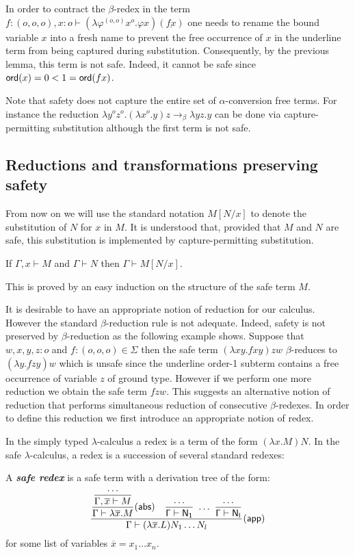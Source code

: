 \documentclass{llncs}
\newcommand\defname[1]{{\bf\em #1}\index{#1}}
\newcommand\betared{\rightarrow_\beta}
\newcommand\subst[2]{\left[ #1/#2 \right]}
\newcommand\dps{\displaystyle}
\newcommand\rulef[2]{\frac{\dps #1}{\dps #2}}
\newcommand\ord[1]{{\sf ord}(#1)}
\begin{document}
\begin{example}
In order to contract the $\beta$-redex in the term $f:(o,o,o),x:o \vdash (\lambda \varphi^{(o,o)} x^o . \varphi x) (\underline{f x})$ one needs to rename the bound variable $x$ into a fresh name to prevent the free occurrence of $x$ in the underline term from being captured during substitution. Consequently, by the previous lemma, this term is not safe. Indeed, it cannot be safe since $\ord{x} = 0 < 1 = \ord{f x}$.
\end{example}

Note that safety does not capture the entire set of $\alpha$-conversion free terms. For instance the reduction $\lambda y^o z^o. (\lambda x^o .y) z \betared \lambda yz.y$ can be done via capture-permitting substitution although the first term is not safe.

\subsection{Reductions and transformations preserving safety}

From now on we will use the standard notation $M\subst{N}{x}$ to denote the substitution of $N$ for $x$ in $M$.
It is understood that, provided that $M$ and $N$ are safe, this substitution
is implemented by capture-permitting substitution.


\begin{lemma}
\label{lem:subst_preserve_safety}
If $\Gamma, x \vdash M$ and $\Gamma \vdash N$ then $\Gamma \vdash M[N/x]$.
\end{lemma}
This is proved by an easy induction on the structure of the safe term $M$.


It is desirable to have an appropriate notion of reduction for our calculus. However the standard $\beta$-reduction rule is not adequate. Indeed, safety is not preserved by $\beta$-reduction as the following example shows. Suppose that $w,x,y,z : o$ and $f : (o,o,o) \in \Sigma$ then the safe term $(\lambda x y . f x y) z w$ $\beta$-reduces to $(\underline{\lambda y . f z y}) w$ which is unsafe since the underline order-1 subterm  contains a free occurrence of variable $z$ of ground type. However if we perform one more reduction we obtain the safe term
$f z w$. This suggests an alternative notion of reduction that performs simultaneous reduction of consecutive $\beta$-redexes. In order to define this reduction we first introduce an appropriate notion of redex.

In the simply typed $\lambda$-calculus a redex is a term of the form
$(\lambda x . M) N$. In the safe $\lambda$-calculus, a redex is a succession of several standard redexes:
\begin{definition}
A \defname{safe redex} is a safe term with a derivation tree of the form:
$$   \rulef{
            \rulef{\rulef{\ldots}{\Gamma, \overline{x}\vdash M}}{\Gamma \vdash \lambda \overline{x} . M} (\sf{abs})
            \quad
            \rulef{\ldots}{\Gamma \vdash N_1}  \ \ldots \  \rulef{\ldots}{\Gamma \vdash N_l}
    }
    {
       \Gamma \vdash (\lambda \overline{x} . L) N_1 \ldots N_l
    } (\sf{app})
$$
for some list of variables $\overline{x}=x_1\ldots x_n$.
\end{definition}
\end{document}
